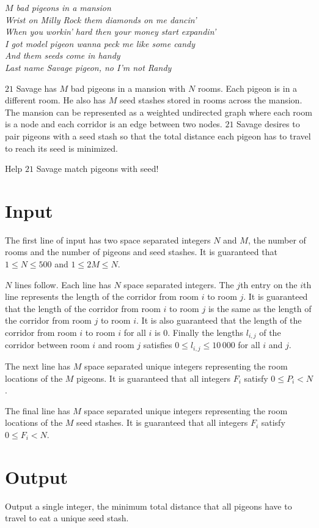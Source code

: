 
\begin{center}
\textit{
$M$ bad pigeons in a mansion \\
Wrist on Milly Rock them diamonds on me dancin' \\
When you workin' hard then your money start expandin' \\
I got model pigeon wanna peck me like some candy \\
And them seeds come in handy \\
Last name Savage pigeon, no I'm not Randy \\
}
\end{center}

$21$ Savage has $M$ bad pigeons in a mansion with $N$ rooms. Each pigeon
is in a different room. He also has $M$ seed stashes stored in rooms across
the mansion. The mansion can be represented as a weighted undirected graph
where each room is a node and each corridor is an edge between two nodes. $21$
Savage desires to pair pigeons with a seed stash so that the total distance
each pigeon has to travel to reach its seed is minimized.

\medskip

Help $21$ Savage match pigeons with seed!

\section*{Input}

The first line of input has two space separated integers $N$ and $M$, the
number of rooms and the number of pigeons and seed stashes. It is guaranteed
that $1 \le N \le 500$ and $1 \le 2M \le N$.

$N$ lines follow. Each line has $N$ space separated integers. The $j$th entry
on the $i$th line represents the length of the corridor from room $i$ to room
$j$. It is guaranteed that the length of the corridor from room $i$ to room
$j$ is the same as the length of the corridor from room $j$ to room $i$. It
is also guaranteed that the length of the corridor from room $i$ to room $i$
for all $i$ is $0$. Finally the lengths $l_{i,j}$ of the corridor between room
$i$ and room $j$ satisfies $0 \le l_{i,j} \le 10\,000$ for all $i$ and $j$.

The next line has $M$ space separated unique integers representing the room
locations of the $M$ pigeons. It is guaranteed that all integers $F_i$ satisfy
$0 \le P_i < N$.

The final line has $M$ space separated unique integers representing the room
locations of the $M$ seed stashes. It is guaranteed that all integers $F_i$ satisfy
$0 \le F_i < N$.

\section*{Output}

Output a single integer, the minimum total distance that all pigeons have to
travel to eat a unique seed stash.
